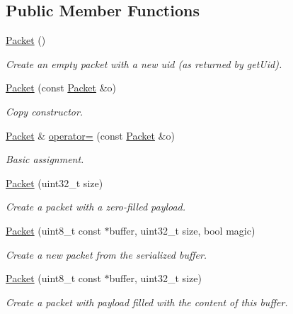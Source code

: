 \subsection*{Public Member Functions}
\begin{DoxyCompactItemize}
\item 
\hyperlink{classns3_1_1Packet_ac1a30f8cf28346960cfac4a2c9fa7026}{Packet} ()
\begin{DoxyCompactList}\small\item\em Create an empty packet with a new uid (as returned by get\+Uid). \end{DoxyCompactList}\item 
\hyperlink{classns3_1_1Packet_aa8b64449ccabad33e9e61c70e06db166}{Packet} (const \hyperlink{classns3_1_1Packet}{Packet} \&o)
\begin{DoxyCompactList}\small\item\em Copy constructor. \end{DoxyCompactList}\item 
\hyperlink{classns3_1_1Packet}{Packet} \& \hyperlink{classns3_1_1Packet_a8f7627bc5113f3fa52ad68a20d57aa94}{operator=} (const \hyperlink{classns3_1_1Packet}{Packet} \&o)
\begin{DoxyCompactList}\small\item\em Basic assignment. \end{DoxyCompactList}\item 
\hyperlink{classns3_1_1Packet_a897aab15901dcf1f05f075db7b8d04b1}{Packet} (uint32\+\_\+t size)
\begin{DoxyCompactList}\small\item\em Create a packet with a zero-\/filled payload. \end{DoxyCompactList}\item 
\hyperlink{classns3_1_1Packet_ab2d46939241156115411e66aa1a65f09}{Packet} (uint8\+\_\+t const $\ast$buffer, uint32\+\_\+t size, bool magic)
\begin{DoxyCompactList}\small\item\em Create a new packet from the serialized buffer. \end{DoxyCompactList}\item 
\hyperlink{classns3_1_1Packet_a7f6a0314efee85ac6cf4a64e05450538}{Packet} (uint8\+\_\+t const $\ast$buffer, uint32\+\_\+t size)
\begin{DoxyCompactList}\small\item\em Create a packet with payload filled with the content of this buffer. \end{DoxyCompactList}\item 

\end{DoxyCompactItemize}
